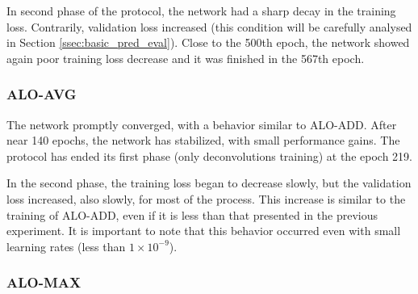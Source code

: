 In second phase of the protocol, the network had a sharp decay in the training loss. %
Contrarily, validation loss increased (this condition will be carefully analysed in Section \ref{ssec:basic_pred_eval}).
Close to the 500th epoch, the network showed again poor training loss decrease and it was finished in the 567th epoch.

\subsubsection{ALO-AVG}
\label{ssec:bsds_subexp1_avg}

The network promptly converged, with a behavior similar to ALO-ADD.
After near 140 epochs, the network has stabilized, with small performance gains. 
The protocol has ended its first phase (only deconvolutions training) at the epoch 219.



In the second phase, the training loss began to decrease slowly, but the validation loss increased, also slowly, for most of the process.
This increase is similar to the training of ALO-ADD, even if it is less than that presented in the previous experiment.
It is important to note that this behavior occurred even with small learning rates (less than $1 \times 10^{-9}$). 

\subsubsection{ALO-MAX}
\label{ssec:bsds_subexp1_max}

